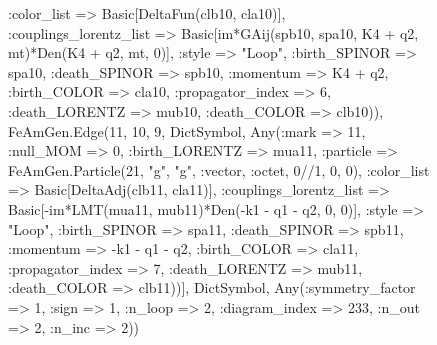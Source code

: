 \documentclass{revtex4}
\begin{document}
\begin{figure}[!htb]
\begin{center}
{:color_list => Basic[DeltaFun(clb10, cla10)], :couplings_lorentz_list => Basic[im*GAij(spb10, spa10, K4 + q2, mt)*Den(K4 + q2, mt, 0)], :style => "Loop", :birth_SPINOR => spa10, :death_SPINOR => spb10, :momentum => K4 + q2, :birth_COLOR => cla10, :propagator_index => 6, :death_LORENTZ => mub10, :death_COLOR => clb10)), FeAmGen.Edge(11, 10, 9, Dict{Symbol, Any}(:mark => 11, :null_MOM => 0, :birth_LORENTZ => mua11, :particle => FeAmGen.Particle(21, "g", "g", :vector, :octet, 0//1, 0, 0), :color_list => Basic[DeltaAdj(clb11, cla11)], :couplings_lorentz_list => Basic[-im*LMT(mua11, mub11)*Den(-k1 - q1 - q2, 0, 0)], :style => "Loop", :birth_SPINOR => spa11, :death_SPINOR => spb11, :momentum => -k1 - q1 - q2, :birth_COLOR => cla11, :propagator_index => 7, :death_LORENTZ => mub11, :death_COLOR => clb11))], Dict{Symbol, Any}(:symmetry_factor => 1, :sign => 1, :n_loop => 2, :diagram_index => 233, :n_out => 2, :n_inc => 2)) 
}
\end{center}
\end{figure}
\end{document}
